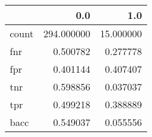 \begin{tabular}{lrr}
\toprule
{} &         0.0 &        1.0 \\
\midrule
count &  294.000000 &  15.000000 \\
fnr   &    0.500782 &   0.277778 \\
fpr   &    0.401144 &   0.407407 \\
tnr   &    0.598856 &   0.037037 \\
tpr   &    0.499218 &   0.388889 \\
bacc  &    0.549037 &   0.055556 \\
\bottomrule
\end{tabular}
